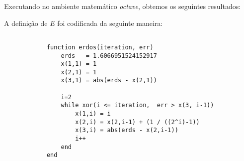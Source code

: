 		Executando no ambiente matemático \emph{octave}, obtemos os seguintes
		resultados:

		

		A definição de $E$ foi codificada da seguinte maneira:

		\begin{lstlisting}

			function erdos(iteration, err)
				erds   = 1.6066951524152917
				x(1,1) = 1
				x(2,1) = 1
				x(3,1) = abs(erds - x(2,1))

				i=2
				while xor(i <= iteration,  err > x(3, i-1))
					x(1,i) = i
					x(2,i) = x(2,i-1) + (1 / ((2^i)-1))
					x(3,i) = abs(erds - x(2,i-1))
					i++
				end
			end

		\end{lstlisting}
